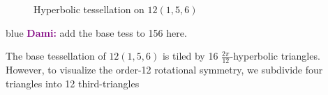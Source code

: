 \documentclass[12pt,reqno]{amsart}
\newenvironment{dami}{
  \medskip
\begin{color}{blue}
    \textcolor{purple}{\textbf{Dami:}} 
}{
\end{color}
  \medskip
}
\DeclareMathOperator{\Aut}{Aut}
\newtheorem{lemma}[theorem]{Lemma}
\theoremstyle{definition}
\theoremstyle{remark}
\newtheorem*{remark}{Remark}
\begin{document}
\begin{figure}[htbp]
    \centering
    \caption{Hyperbolic tessellation on $12(1, 5, 6)$}%
    \label{fig:156}%
\end{figure}

\begin{dami} add the base tess to 156 here. \end{dami}

The base tessellation of $12(1,5,6)$ is tiled by 16 $\frac{2 \pi}{12}$-hyperbolic triangles. However, to visualize the order-12 rotational symmetry, we subdivide four triangles into 12 third-triangles %










\end{document}
